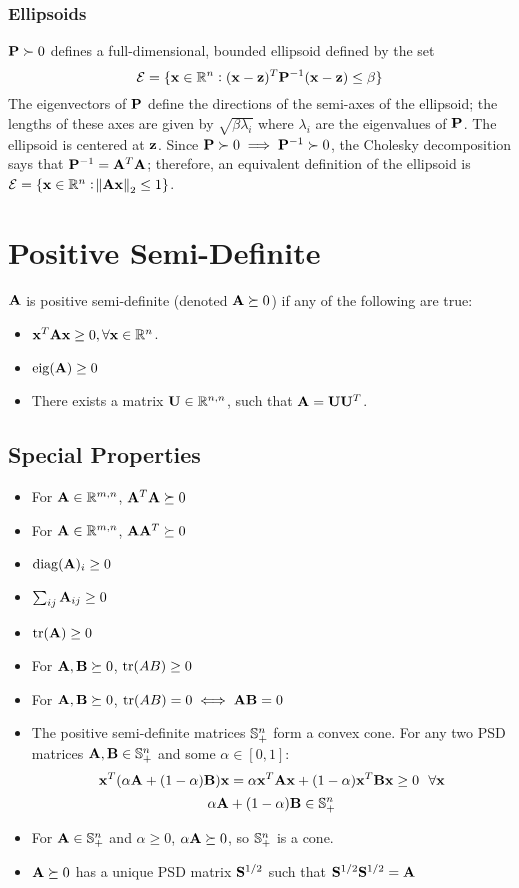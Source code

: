 \subsubsection{Ellipsoids}
$\mathbf{P}\succ0$ defines a full-dimensional, bounded ellipsoid defined by the set
\begin{equation}
\mathcal{E}=\{\mathbf{x}\in\mathbb{R}^{n}: (\mathbf{x}-\mathbf{z})^T\mathbf{P}^{-1}(\mathbf{x}-\mathbf{z})\le \beta\}
\end{equation}
The eigenvectors of $\mathbf{P}$ define the directions of the semi-axes of the ellipsoid; the lengths of these axes are given by $\sqrt{\beta\lambda_i}$ where $\lambda_i$ are the eigenvalues of $\mathbf{P}$. The ellipsoid is centered at $\mathbf{z}$. Since $\mathbf{P}\succ 0 \implies \mathbf{P}^{-1}\succ 0$, the Cholesky decomposition says that $\mathbf{P}^{-1}=\mathbf{A}^T\mathbf{A}$; therefore, an equivalent definition of the ellipsoid is $\mathcal{E}=\{\mathbf{x}\in\mathbb{R}^{n}: \norm{\mathbf{A}\mathbf{x}}_2\le1\}$.

\section{Positive Semi-Definite}

$\mathbf{A}$ is positive semi-definite (denoted $\mathbf{A}\succeq0$) if any of the following are true:
\begin{itemize}
\item $\mathbf{x}^T\mathbf{A}\mathbf{x}\ge0,\forall\mathbf{x}\in\mathbb{R}^{n}$.
\item $\operatorname{eig}(\mathbf{A})\ge0$
\item There exists a matrix $\mathbf{U}\in\mathbb{R}^{n,n}$, such that $\mathbf{A}=\mathbf{U}\mathbf{U}^T$.
\end{itemize}

\subsection*{Special Properties}
\begin{itemize}
\item For $\mathbf{A}\in\mathbb{R}^{m,n}$, $\mathbf{A}^T\mathbf{A}\succeq0$
\item For $\mathbf{A}\in\mathbb{R}^{m,n}$, $\mathbf{A}\mathbf{A}^T\succeq0$
\item $\operatorname{diag}(\mathbf{A})_i\ge0$
\item $\sum_{ij} \mathbf{A}_{ij}\ge0$
\item $\operatorname{tr}(\mathbf{A})\ge0$
\item For $\mathbf{A},\mathbf{B}\succeq0$, $\operatorname{tr}(AB)\ge0$
\item For $\mathbf{A},\mathbf{B}\succeq0$, $\operatorname{tr}(AB)=0\iff \mathbf{A}\mathbf{B}=0$
\item The positive semi-definite matrices $\mathbb{S}^n_+$ form a convex cone. For any two PSD matrices $\mathbf{A},\mathbf{B}\in\mathbb{S}^n_+$ and some $\alpha\in[0,1]$:
\begin{equation}
\mathbf{x}^T(\alpha\mathbf{A}+(1-\alpha)\mathbf{B})\mathbf{x}=\alpha \mathbf{x}^T\mathbf{A}\mathbf{x}+(1-\alpha)\mathbf{x}^T\mathbf{B}\mathbf{x}\ge0~~\forall\mathbf{x}
\end{equation}
\begin{equation}
\alpha\mathbf{A}+(1-\alpha)\mathbf{B}\in\mathbb{S}^n_+
\end{equation}
\item For $\mathbf{A}\in\mathbb{S}^n_+$ and $\alpha\ge0$, $\alpha\mathbf{A}\succeq0$, so $\mathbb{S}^n_+$ is a cone.
\item $\mathbf{A}\succeq 0$ has a unique PSD matrix $\mathbf{S}^{1/2}$ such that $\mathbf{S}^{1/2}\mathbf{S}^{1/2}=\mathbf{A}$
\end{itemize}

